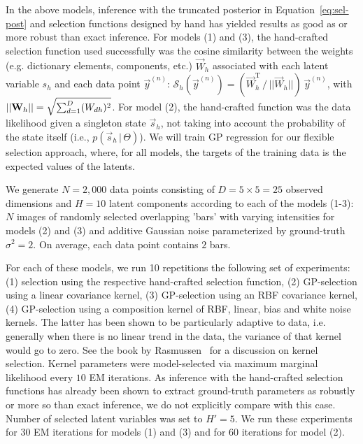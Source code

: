 In the above models, inference with the truncated posterior in Equation~\eqref{eq:sel-post} and selection functions designed by hand has yielded results as good as or more robust than exact inference.
For models (1) and (3), the hand-crafted selection function used successfully was the cosine similarity between the weights (e.g. dictionary elements, components, etc.) $\vec{W}_h$ associated with each latent variable $s_h$ and 
each data point $\vec{y}^{(n)}$: $  \mathcal{S}_h(\vec{y}^{(n)}) = (\vec{W}_{h}^{\mathrm{T}}\,/\,||\vec{W}_{h}||)\,\vec{y}^{(n)}$, with $\textstyle ||{\mathbf{W}}_{h}||=\sqrt{\sum_{d=1}^D(W_{dh})^2}$.
For model (2), the hand-crafted function was the data likelihood given a singleton state $\vec{s}_h$, not taking into account
the probability of the state itself  (i.e., $p(\vec{s}_h\,|\,\Theta)$).
We will train GP regression for our flexible selection approach, where, for all models, the targets of the training data is the expected values of the latents.

We generate $N=2,000$ data points consisting of $D=5\times5=25$ observed dimensions and $H=10$ latent components according to each of the models (1-3):
$N$ images of randomly selected overlapping 'bars' with varying intensities for models (2) and (3) and additive Gaussian noise parameterized by ground-truth $\sigma^2 = 2$.
On average, each data point contains $2$ bars.

For each of these models, we run 10 repetitions the following set of experiments: (1) selection using the respective hand-crafted selection function,
(2) GP-selection using a linear covariance kernel, (3) GP-selection using an RBF covariance kernel, (4) GP-selection using a composition kernel of RBF, linear, bias and white noise kernels.
The latter has been shown to be particularly adaptive to data, i.e. generally when there is no linear trend in the data, the variance of that kernel would go to zero. See the book by Rasmussen~\citep{RasmussenGPbook} for a discussion on kernel selection.
Kernel parameters were model-selected via maximum marginal likelihood every $10$ EM iterations.
As inference with the hand-crafted selection functions has already been shown to extract ground-truth parameters as robustly or more so than exact inference, we do not explicitly compare with this case.
Number of selected latent variables was set to $H'=5$.
%
We run these experiments for $30$ EM iterations for models (1) and (3) and for $60$ iterations for model (2).

